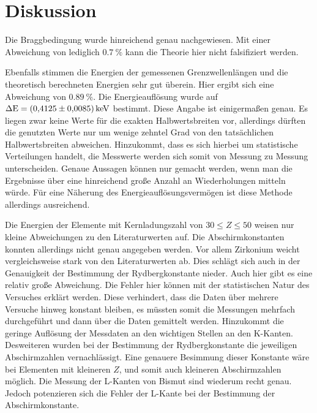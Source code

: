 \section{Diskussion}
\label{sec:Diskussion}

Die Braggbedingung wurde hinreichend genau nachgewiesen.
Mit einer Abweichung von lediglich $\SI{0.7}{\percent}$ kann die Theorie hier nicht falsifiziert werden.

Ebenfalls stimmen die Energien der gemessenen Grenzwellenlängen und die theoretisch berechneten Energien sehr gut überein.
Hier ergibt sich eine Abweichung von $\SI{0.89}{\percent}$.
Die Energieauflösung wurde auf $\Delta\text{E} = \SI{0.4125\pm0.0085}{\kilo\electronvolt}$ bestimmt.
Diese Angabe ist einigermaßen genau.
Es liegen zwar keine Werte für die exakten Halbwertsbreiten vor, allerdings dürften die genutzten Werte nur um wenige zehntel Grad von den tatsächlichen Halbwertsbreiten abweichen.
Hinzukommt, dass es sich hierbei um statistische Verteilungen handelt, die Messwerte werden sich somit von Messung zu Messung unterscheiden.
Genaue Aussagen können nur gemacht werden, wenn man die Ergebnisse über eine hinreichend große Anzahl an Wiederholungen mitteln würde.
Für eine Näherung des Energieauflösungsvermögen ist diese Methode allerdings ausreichend.

Die Energien der Elemente mit Kernladungszahl von $30 \leq Z \leq 50$ weisen nur kleine Abweichungen zu den Literaturwerten auf.
Die Abschirmkonstanten konnten allerdings nicht genau angegeben werden.
Vor allem Zirkonium weicht vergleichsweise stark von den Literaturwerten ab.
Dies schlägt sich auch in der Genauigkeit der Bestimmung der Rydbergkonstante nieder.
Auch hier gibt es eine relativ große Abweichung.
Die Fehler hier können mit der statistischen Natur des Versuches erklärt werden.
Diese verhindert, dass die Daten über mehrere Versuche hinweg konstant bleiben, es müssten somit die Messungen mehrfach durchgeführt und dann über die Daten gemittelt werden.
Hinzukommt die geringe Auflösung der Messdaten an den wichtigen Stellen an den K-Kanten.
Desweiteren wurden bei der Bestimmung der Rydbergkonstante die jeweiligen Abschirmzahlen vernachlässigt. Eine genauere Besimmung dieser Konstante wäre bei Elementen mit kleineren $Z$,
und somit auch kleineren Abschirmzahlen möglich.
Die Messung der L-Kanten von Bismut sind wiederum recht genau.
Jedoch potenzieren sich die Fehler der L-Kante bei der Bestimmung der Abschirmkonstante.
